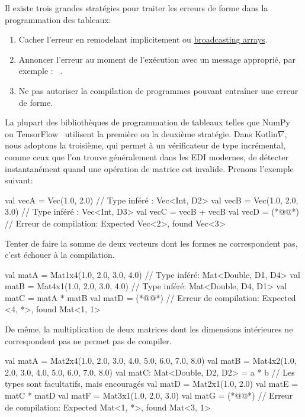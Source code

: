 \noindent Il existe trois grandes stratégies pour traiter les erreurs de forme dans la programmation des tableaux:
%
\begin{enumerate}
    \item Cacher l'erreur en remodelant implicitement ou \href{https://docs.scipy.org/doc/numpy-1.15.0/user/basics.broadcasting.html}{broadcasting arrays}.
    \item Annoncer l'erreur au moment de l'exécution avec un message approprié, par exemple : ~\href{https://www.tensorflow.org/api_docs/python/tf/errors/InvalidArgumentError}{}.
    \item Ne pas autoriser la compilation de programmes pouvant entraîner une erreur de forme. \\
\end{enumerate}
%
La plupart des bibliothèques de programmation de tableaux telles que NumPy~\citep{van2011numpy} ou TensorFlow~\citep{abadi2016tensorflow} utilisent la première ou la deuxième stratégie. Dans Kotlin$\nabla$, nous adoptons la troisième, qui permet à un vérificateur de type incrémental, comme ceux que l'on trouve généralement dans les EDI modernes, de détecter instantanément quand une opération de matrice est invalide. Prenons l'exemple suivant:
%
\begin{kotlinlisting}
val vecA = Vec(1.0, 2.0)      // Type inféré : Vec<Int, D2>
val vecB = Vec(1.0, 2.0, 3.0) // Type inféré : Vec<Int, D3>
val vecC = vecB + vecB
val vecD = (*@@*) // Erreur de compilation: Expected Vec<2>, found Vec<3>
\end{kotlinlisting}
%
Tenter de faire la somme de deux vecteurs dont les formes ne correspondent pas, c'est échouer à la compilation.
%
\begin{kotlinlisting}
val matA = Mat1x4(1.0, 2.0, 3.0, 4.0) // Type inféré: Mat<Double, D1, D4>
val matB = Mat4x1(1.0, 2.0, 3.0, 4.0) // Type inféré: Mat<Double, D4, D1>
val matC = matA * matB
val matD = (*@@*) // Erreur de compilation: Expected <4, *>, found Mat<1, 1>
\end{kotlinlisting}
%
De même, la multiplication de deux matrices dont les dimensions intérieures ne correspondent pas ne permet pas de compiler.
%
\begin{kotlinlisting}
val matA = Mat2x4(1.0, 2.0, 3.0, 4.0,
                  5.0, 6.0, 7.0, 8.0)
val matB = Mat4x2(1.0, 2.0,
                  3.0, 4.0,
                  5.0, 6.0,
                  7.0, 8.0)
val matC: Mat<Double, D2, D2> = a * b // Les types sont facultatifs, mais encouragés
val matD = Mat2x1(1.0, 2.0)
val matE = matC * matD
val matF = Mat3x1(1.0, 2.0, 3.0)
val matG = (*@@*) // Erreur de compilation: Expected Mat<1, *>, found Mat<3, 1>
\end{kotlinlisting}
